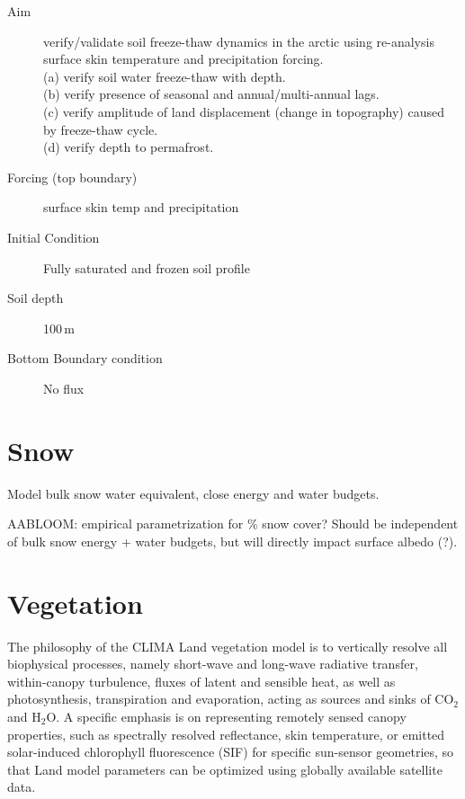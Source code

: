 \documentclass[twoside,10pt]{report}
\begin{document}
\begin{description}
\item [Aim] verify/validate soil freeze-thaw dynamics in the arctic using re-analysis surface skin temperature and precipitation forcing. \\
(a) verify soil water freeze-thaw with depth. \\
(b) verify presence of seasonal and annual/multi-annual lags. \\
(c) verify amplitude of land displacement (change in topography) caused by freeze-thaw cycle. \\
(d) verify depth to permafrost.
\item [Forcing (top boundary)] surface skin temp and precipitation
\item [Initial Condition] Fully saturated and frozen soil profile
\item [Soil depth] 100\,m
\item [Bottom Boundary condition] No flux
\end{description}



\chapter{Snow}

Model bulk snow water equivalent, close energy and water budgets.

AABLOOM: empirical parametrization for \% snow cover? Should be independent of bulk snow energy + water budgets, but will directly impact surface albedo (?).

\chapter{Vegetation}



The philosophy of the CLIMA Land vegetation model is to vertically resolve all biophysical processes, namely short-wave and long-wave radiative transfer, within-canopy turbulence, fluxes of latent and sensible heat, as well as photosynthesis, transpiration and evaporation, acting as sources and sinks of CO$_2$ and H$_2$O. A specific emphasis is on representing remotely sensed canopy properties, such as spectrally resolved reflectance, skin temperature, or emitted solar-induced chlorophyll fluorescence (SIF) for specific sun-sensor geometries, so that Land model parameters can be optimized using globally available satellite data.
\end{document}
